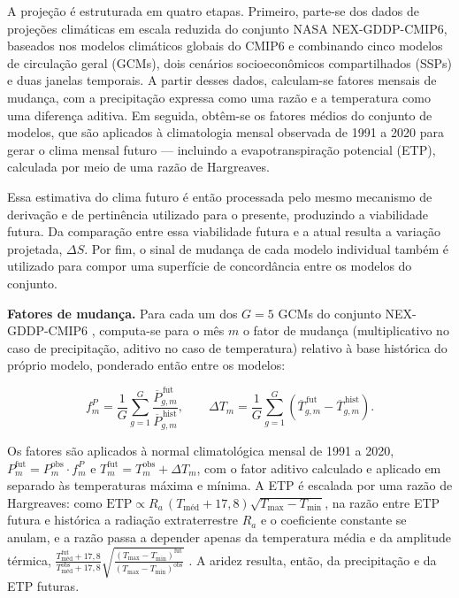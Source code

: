 A projeção é estruturada em quatro etapas. Primeiro, parte-se dos dados de projeções climáticas em
escala reduzida do conjunto NASA NEX-GDDP-CMIP6, baseados nos modelos climáticos globais do CMIP6 e
combinando cinco modelos de circulação geral (GCMs), dois cenários socioeconômicos compartilhados
(SSPs) e duas janelas temporais. A partir desses dados, calculam-se fatores mensais de mudança, com a
precipitação expressa como uma razão e a temperatura como uma diferença aditiva. Em seguida, obtêm-se
os fatores médios do conjunto de modelos, que são aplicados à climatologia mensal observada de 1991 a
2020 para gerar o clima mensal futuro --- incluindo a evapotranspiração potencial (ETP), calculada por
meio de uma razão de Hargreaves.

Essa estimativa do clima futuro é então processada pelo mesmo mecanismo de derivação e de pertinência
utilizado para o presente, produzindo a viabilidade futura. Da comparação entre essa viabilidade
futura e a atual resulta a variação projetada, $\Delta S$. Por fim, o sinal de mudança de cada modelo
individual também é utilizado para compor uma superfície de concordância entre os modelos do
conjunto.

\textbf{Fatores de mudança.} Para cada um dos $G = 5$ GCMs do conjunto NEX-GDDP-CMIP6
\citep{thrasher_nasa_2022}, computa-se para o mês $m$ o fator de mudança (multiplicativo no caso de
precipitação, aditivo no caso de temperatura) relativo à base histórica do próprio modelo, ponderado
então entre os modelos:

\begin{equation*}
  f^{P}_m = \frac{1}{G}\sum_{g=1}^{G} \frac{\overline{P}^{\,\text{fut}}_{g,m}}
                                              {\overline{P}^{\,\text{hist}}_{g,m}},
   \qquad
   \Delta T_m = \frac{1}{G}\sum_{g=1}^{G}
     \left(\overline{T}^{\,\text{fut}}_{g,m} - \overline{T}^{\,\text{hist}}_{g,m}\right).
\end{equation*}


Os fatores são aplicados à normal climatológica mensal de 1991 a 2020,
$P^{\text{fut}}_m = P^{\text{obs}}_m \cdot f^{P}_m$ e
$T^{\text{fut}}_m = T^{\text{obs}}_m + \Delta T_m$, com o fator aditivo calculado e aplicado em separado
às temperaturas máxima e mínima. A ETP é escalada por uma razão de Hargreaves: como
$\mathrm{ETP} \propto R_a\,(T_{\text{méd}} + 17{,}8)\sqrt{T_{\max} - T_{\min}}$, na razão entre ETP
futura e histórica a radiação extraterrestre $R_a$ e o coeficiente constante se anulam, e a razão
passa a depender apenas da temperatura média e da amplitude térmica,
$\frac{T^{\text{fut}}_{\text{méd}}+17{,}8}{T^{\text{obs}}_{\text{méd}}+17{,}8}
 \sqrt{\frac{(T_{\max}-T_{\min})^{\text{fut}}}{(T_{\max}-T_{\min})^{\text{obs}}}}$
\parencites{george_h_hargreaves_reference_1985}[p.~55, eq.~8]{hargreaves_history_2003}. A aridez resulta, então, da precipitação e da ETP futuras.

